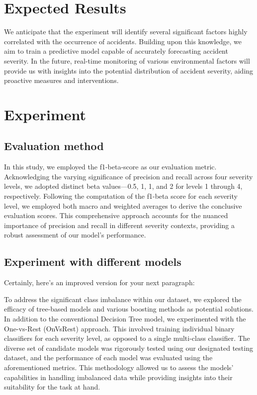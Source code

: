 \documentclass[10pt,twocolumn,letterpaper]{article}
\begin{document}
\begin{CJK}{UTF8}{bsmi}
\section{Expected Results}
We anticipate that the experiment will identify several significant factors highly correlated with the occurrence of accidents. Building upon this knowledge, we aim to train a predictive model capable of accurately forecasting accident severity. In the future, real-time monitoring of various environmental factors will provide us with insights into the potential distribution of accident severity, aiding proactive measures and interventions.

\section{Experiment}

\subsection{Evaluation method}
In this study, we employed the f1-beta-score as our evaluation metric. Acknowledging the varying significance of precision and recall across four severity levels, we adopted distinct beta values—0.5, 1, 1, and 2 for levels 1 through 4, respectively. Following the computation of the f1-beta score for each severity level, we employed both macro and weighted averages to derive the conclusive evaluation scores. This comprehensive approach accounts for the nuanced importance of precision and recall in different severity contexts, providing a robust assessment of our model's performance.

\subsection{Experiment with different models}
Certainly, here's an improved version for your next paragraph:

To address the significant class imbalance within our dataset, we explored the efficacy of tree-based models and various boosting methods as potential solutions. In addition to the conventional Decision Tree model, we experimented with the One-vs-Rest (OnVsRest) approach. This involved training individual binary classifiers for each severity level, as opposed to a single multi-class classifier. The diverse set of candidate models was rigorously tested using our designated testing dataset, and the performance of each model was evaluated using the aforementioned metrics. This methodology allowed us to assess the models' capabilities in handling imbalanced data while providing insights into their suitability for the task at hand.


\end{CJK}
\end{document}
